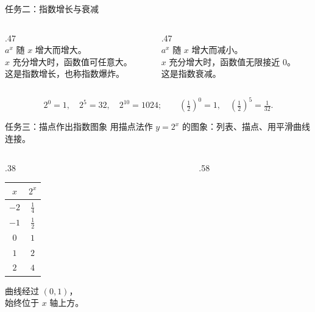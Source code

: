 \documentclass[aspectratio=169,10pt]{beamer}
\begin{document}
\begin{frame}[t]{任务二：指数增长与衰减}
 \begin{columns}[T,onlytextwidth]
  \begin{column}{.47\textwidth}
   \\
   $a^x$ 随 $x$ 增大而增大。\\
   $x$ 充分增大时，函数值可任意大。\\
   这是指数增长，也称指数爆炸。
  \end{column}
  \begin{column}{.47\textwidth}
   \\
   $a^x$ 随 $x$ 增大而减小。\\
   $x$ 充分增大时，函数值无限接近 $0$。\\
   这是指数衰减。
  \end{column}
 \end{columns}
 \pause
 \gap
 \[2^0=1,\quad2^5=32,\quad2^{10}=1024;\qquad
  (\tfrac12)^0=1,\quad(\tfrac12)^5=\tfrac1{32}.\]
\end{frame}

\begin{frame}[t]{任务三：描点作出指数图象}
 用描点法作 $y=2^x$ 的图象：列表、描点、用平滑曲线连接。
 \begin{columns}[T,onlytextwidth]
  \begin{column}{.38\textwidth}
   \centering\normalsize\renewcommand{\arraystretch}{1.55}
   \begin{tabular}{c|c}
    $x$ & $2^x$\\\hline
    $-2$ & $\frac14$\\$-1$ & $\frac12$\\$0$ & $1$\\$1$ & $2$\\$2$ & $4$
   \end{tabular}
   \pause
   \par\gap
   曲线经过 $(0,1)$，\\始终位于 $x$ 轴上方。
  \end{column}
  \begin{column}{.58\textwidth}\centering\expplot[1]\end{column}
 \end{columns}
\end{frame}
\end{document}
